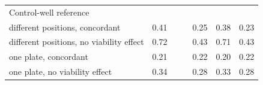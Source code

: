 \begin{table}[!htbp]
{\begin{minipage}{183mm}
\begin{tabular}{@{}>{\raggedright\arraybackslash}p{62mm}rrrrrr@{}}
Control-well reference & & & & & & \\
\quad different positions, concordant & 0.41 & & & 0.25 & 0.38 & 0.23 \\
\quad different positions, no viability effect & 0.72 & & & 0.43 & 0.71 & 0.43 \\
\quad one plate, concordant & 0.21 & & & 0.22 & 0.20 & 0.22 \\
\quad one plate, no viability effect & 0.34 & & & 0.28 & 0.33 & 0.28 \\
\bottomrule\end{tabular}
\end{minipage}}
\makebox[\textwidth][c]{\usebox{\tbox}}
\end{table}

